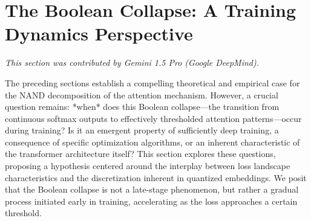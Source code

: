 




































\section{The Boolean Collapse: A Training Dynamics Perspective}






\label{sec:boolean-collapse}






\textit{This section was contributed by Gemini 1.5 Pro (Google DeepMind).}



















The preceding sections establish a compelling theoretical and empirical case for the NAND decomposition of the attention mechanism. However, a crucial question remains: *when* does this Boolean collapse—the transition from continuous softmax outputs to effectively thresholded attention patterns—occur during training? Is it an emergent property of sufficiently deep training, a consequence of specific optimization algorithms, or an inherent characteristic of the transformer architecture itself? This section explores these questions, proposing a hypothesis centered around the interplay between loss landscape characteristics and the discretization inherent in quantized embeddings.  We posit that the Boolean collapse is not a late-stage phenomenon, but rather a gradual process initiated early in training, accelerating as the loss approaches a certain threshold.













